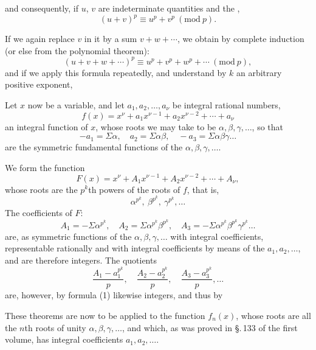 
and consequently, if $u$, $v$ are indeterminate quantities and the
,
\[
(u+v)^p \equiv u^p+v^p \ (\mathrm{mod}\ p).
\]

If we again replace $v$ in it by a sum $v+w+\cdots$,
we obtain by complete induction (or else from the
polynomial theorem):
\[
(u+v+w+\cdots)^p \equiv u^p+v^p+w^p+\cdots \ (\mathrm{mod}\ p),
\]
and if we apply this formula repeatedly, and understand by $k$
an arbitrary positive exponent,

Let $x$ now be a variable, and let $a_1, a_2, \dots, a_\nu$ be integral rational
numbers,
\[
f(x) = x^\nu + a_1 x^{\nu-1} + a_2 x^{\nu-2} + \cdots + a_\nu
\]
an integral function of $x$, whose roots we may take to be $\alpha, \beta, \gamma, \dots$,
so that
\[
-a_1 = \Sigma\alpha, \quad a_2 = \Sigma\alpha\beta, \quad -a_3 = \Sigma\alpha\beta\gamma \dots
\]
are the symmetric fundamental functions of the $\alpha, \beta, \gamma, \dots$.

We form the function
\[
F(x) = x^\nu + A_1 x^{\nu-1} + A_2 x^{\nu-2} + \cdots + A_\nu,
\]
whose roots are the $p^{k}$th powers of the roots of $f$, that is,
\[
\alpha^{p^k}, \ \beta^{p^k}, \ \gamma^{p^k}, \dots
\]
The coefficients of $F$:
\[
A_1 = -\Sigma\alpha^{p^k}, \quad A_2 = \Sigma\alpha^{p^k}\beta^{p^k}, \quad A_3 = -\Sigma\alpha^{p^k}\beta^{p^k}\gamma^{p^k} \dots
\]
are, as symmetric functions of the $\alpha, \beta, \gamma, \dots$ with integral
coefficients, representable rationally and with integral coefficients by means of the $a_1, a_2, \dots$, and are
therefore integers. The quotients
\[
\frac{A_1 - a_1^{p^k}}{p}, \quad \frac{A_2 - a_2^{p^k}}{p}, \quad \frac{A_3 - a_3^{p^k}}{p}, \dots
\]
are, however, by formula (1) likewise integers, and thus by

These theorems are now to be applied to the function $f_n(x)$,
whose roots are all the  $n$th roots of unity $\alpha, \beta, \gamma, \dots$, and which, as was proved in \S.\,133 of the first
volume, has integral coefficients $a_1, a_2, \dots$.

